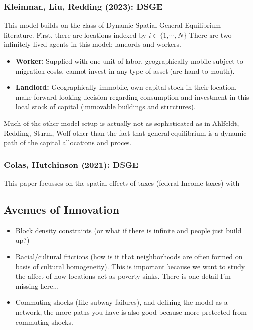 \documentclass[11pt,english]{article}
\begin{document}
\subsubsection{Kleinman, Liu, Redding (2023): DSGE\cite{Kleinman2023}}

This model builds on the class of Dynamic Spatial General Equilibrium literature. First, there are locations indexed by $i\in \{1, \cdots, N\}$ There are two infinitely-lived agents in this model: landords and workers. 
\begin{itemize}
\item \textbf{Worker:} Supplied with one unit of labor, geographically mobile subject to migration costs, cannot invest in any type of asset (are hand-to-mouth).

\item \textbf{Landlord:} Geographically immobile, own capital stock in their location, make forward looking decision regarding consumption and investment in this local stock of capital (immovable buildings and sturctures).
\end{itemize}

Much of the other model setup is actually not as sophisticated as in Ahlfeldt, Redding, Sturm, Wolf other than the fact that general equilibrium is a dynamic path of the capital allocations and proces.

\subsubsection{Colas, Hutchinson (2021): DSGE\cite{Colas2021}}

This paper focusses on the spatial effects of taxes (federal Income taxes) with 

\subsection{Avenues of Innovation}

\begin{itemize}
\item Block density constraints (or what if there is infinite and people just build up?)

\item Racial/cultural frictions (how is it that neighborhoods are often formed on basis of cultural homogeneity). This is important because we want to study the affect of how locations act as poverty sinks. There is one detail I'm missing here...

\item Commuting shocks (like subway failures), and defining the model as a network, the more paths you have is also good because more protected from commuting shocks.
 
\end{itemize}
\end{document}
